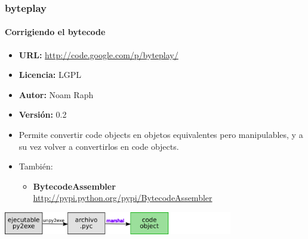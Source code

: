 \documentclass[9pt, notes=hide]{beamer}
\begin{document}
    \begin{frame}
        \frametitle{byteplay}
        \framesubtitle{Corrigiendo el bytecode}

        \begin{itemize}
            \item \textbf{URL:} \url{http://code.google.com/p/byteplay/}
            \item \textbf{Licencia:} LGPL
            \item \textbf{Autor:} Noam Raph
            \item \textbf{Versión:} 0.2
            \item Permite convertir code objects en objetos equivalentes pero manipulables, y a su vez volver a convertirlos en code objects.
        \end{itemize}

        \begin{itemize}
            \item También:
            \begin{itemize}
                \item \textbf{BytecodeAssembler}\\ \url{http://pypi.python.org/pypi/BytecodeAssembler}
            \end{itemize}
        \end{itemize}

        \begin{center}
            \includegraphics[width=10cm]{images/pipe-3.png}
        \end{center}

    \end{frame}
\end{document}
